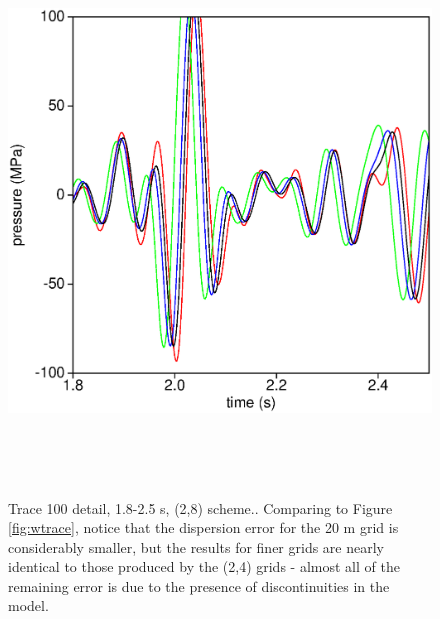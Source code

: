 \begin{figure}
\includegraphics[height=15cm,width=15cm]{./Fig/fig8.ps}
\caption{Trace 100 detail, 1.8-2.5 s, (2,8) scheme..
Comparing to Figure \ref{fig:wtrace}, notice that the dispersion error for
the 20 m grid is considerably smaller, but the results for finer grids
are nearly identical to those produced by the (2,4) grids - almost all
of the remaining error is due to the presence of discontinuities in
the model.}
\label{fig:wtrace8k}
\end{figure}